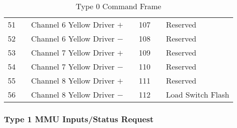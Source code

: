 \documentclass[]{article}
\begin{document}
\begin{table}[]
\begin{tabular}{@{}lllllll@{}}
		51           &                    & Channel 6 Yellow Driver $+$   &                   & 107          &                     & Reserved                     \\
		52           &                    & Channel 6 Yellow Driver $-$   &                   & 108          &                     & Reserved                     \\
		53           &                    & Channel 7 Yellow Driver $+$   &                   & 109          &                     & Reserved                     \\
		54           &                    & Channel 7 Yellow Driver $-$   &                   & 110          &                     & Reserved                     \\
		55           &                    & Channel 8 Yellow Driver $+$   &                   & 111          &                     & Reserved                     \\
		56           &                    & Channel 8 Yellow Driver $-$   &                   & 112          &                     & Load Switch Flash            \\ \cmidrule(r){1-3} \cmidrule(l){5-7} 
	\end{tabular}
	\caption{Type 0 Command Frame}
	\label{tab:frame-type-0}
\end{table}

\clearpage

\subsubsection {Type 1 MMU Inputs/Status Request}
\end{document}
